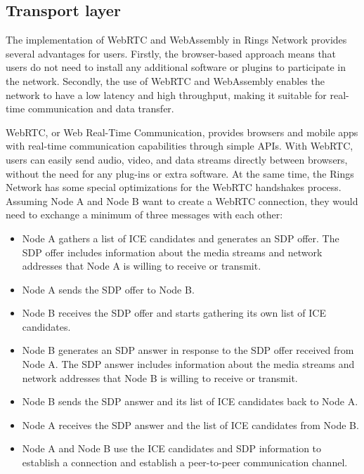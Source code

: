 \documentclass[twocolumn]{article}
\begin{document}
\subsection{Transport layer}
 The implementation of WebRTC and WebAssembly in Rings Network provides several advantages for users. Firstly, the browser-based approach means that users do not need to install any additional software or plugins to participate in the network. Secondly, the use of WebRTC and WebAssembly enables the network to have a low latency and high throughput, making it suitable for real-time communication and data transfer.

 WebRTC, or Web Real-Time Communication, provides browsers and mobile apps with real-time communication capabilities through simple APIs. With WebRTC, users can easily send audio, video, and data streams directly between browsers, without the need for any plug-ins or extra software.
At the same time, the Rings Network has some special optimizations for the WebRTC handshakes process.
 Assuming Node A and Node B want to create a WebRTC connection, they would need to exchange a minimum of three messages with each other:

 \begin{itemize}[itemsep=2pt,topsep=0pt,parsep=0pt]
  \item Node A gathers a list of ICE candidates and generates an SDP offer. The SDP offer includes information about the media streams and network addresses that Node A is willing to receive or transmit.
  \item Node A sends the SDP offer to Node B.
  \item Node B receives the SDP offer and starts gathering its own list of ICE candidates.
  \item Node B generates an SDP answer in response to the SDP offer received from Node A. The SDP answer includes information about the media streams and network addresses that Node B is willing to receive or transmit.
  \item Node B sends the SDP answer and its list of ICE candidates back to Node A.
  \item Node A receives the SDP answer and the list of ICE candidates from Node B.
  \item Node A and Node B use the ICE candidates and SDP information to establish a connection and establish a peer-to-peer communication channel.
  \end{itemize}
\end{document}
